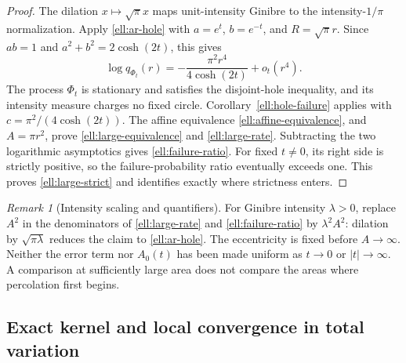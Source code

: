 \documentclass[11pt,a4paper]{article}
\theoremstyle{definition}
\theoremstyle{remark}
\newtheorem{remark}[theorem]{Remark}
\numberwithin{equation}{section}
\begin{document}
\begin{proof}
The dilation $x\mapsto\sqrt\pi x$ maps unit-intensity Ginibre to
the intensity-$1/\pi$ normalization.  Apply
\eqref{ell:ar-hole} with $a=e^t$, $b=e^{-t}$, and
$R=\sqrt\pi r$.  Since $ab=1$ and
$a^2+b^2=2\cosh(2t)$, this gives
\begin{equation}\label{ell:unit-hole}
 \log q_{\Phi_t}(r)
 =-\frac{\pi^2 r^4}{4\cosh(2t)}+o_t(r^4).
\end{equation}
The process $\Phi_t$ is stationary and satisfies the disjoint-hole
inequality, and its intensity measure charges no fixed circle.
Corollary~\ref{ell:hole-failure} applies with
$c=\pi^2/(4\cosh(2t))$.  The affine equivalence
\eqref{ell:affine-equivalence}, and $A=\pi r^2$, prove
\eqref{ell:large-equivalence} and \eqref{ell:large-rate}.
Subtracting the two logarithmic asymptotics gives
\eqref{ell:failure-ratio}.  For fixed $t\ne0$, its right side
is strictly positive, so the failure-probability ratio eventually
exceeds one.  This proves \eqref{ell:large-strict} and identifies
exactly where strictness enters.
\end{proof}

\begin{remark}[Intensity scaling and quantifiers]\label{ell:large-scope}
For Ginibre intensity $\lambda>0$, replace $A^2$ in the denominators
of \eqref{ell:large-rate} and \eqref{ell:failure-ratio} by
$\lambda^2A^2$: dilation by $\sqrt{\pi\lambda}$ reduces the
claim to \eqref{ell:ar-hole}.  The eccentricity is fixed before
$A\to\infty$.  Neither the error term nor $A_0(t)$ has been made
uniform as $t\to0$ or $|t|\to\infty$.  A comparison at sufficiently
large area does not compare the areas where percolation first begins.
\end{remark}

\subsection{Exact kernel and local convergence in total variation}
\end{document}
